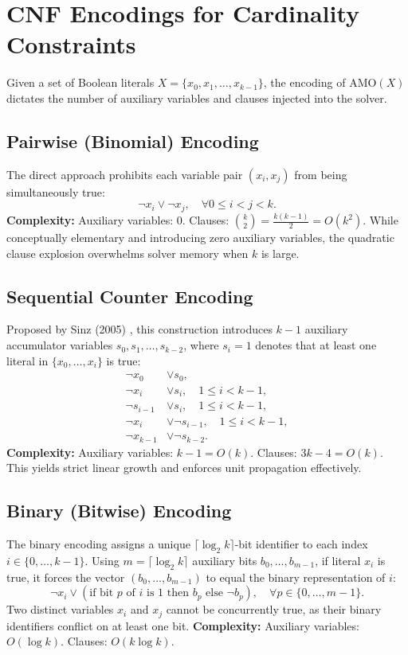 \documentclass[a4paper,fleqn]{cas-sc}
\begin{document}
\section{CNF Encodings for Cardinality Constraints}
Given a set of Boolean literals $X = \{x_0, x_1, \dots, x_{k-1}\}$, the encoding of $\text{AMO}(X)$ dictates the number of auxiliary variables and clauses injected into the solver.

\subsection{Pairwise (Binomial) Encoding}
The direct approach prohibits each variable pair $(x_i, x_j)$ from being simultaneously true:
\begin{equation}
\neg x_i \lor \neg x_j, \quad \forall 0 \le i < j < k.
\end{equation}
\textbf{Complexity:} Auxiliary variables: $0$. Clauses: $\binom{k}{2} = \frac{k(k-1)}{2} = O(k^2)$.
While conceptually elementary and introducing zero auxiliary variables, the quadratic clause explosion overwhelms solver memory when $k$ is large.

\subsection{Sequential Counter Encoding}
Proposed by Sinz (2005) \cite{sinz2005towards}, this construction introduces $k - 1$ auxiliary accumulator variables $s_0, s_1, \dots, s_{k-2}$, where $s_i = 1$ denotes that at least one literal in $\{x_0, \dots, x_i\}$ is true:
\begin{align}
\neg x_0 &\lor s_0, \\
\neg x_i &\lor s_i, \quad 1 \le i < k - 1, \\
\neg s_{i-1} &\lor s_i, \quad 1 \le i < k - 1, \\
\neg x_i &\lor \neg s_{i-1}, \quad 1 \le i < k - 1, \\
\neg x_{k-1} &\lor \neg s_{k-2}.
\end{align}
\textbf{Complexity:} Auxiliary variables: $k - 1 = O(k)$. Clauses: $3k - 4 = O(k)$.
This yields strict linear growth and enforces unit propagation effectively.

\subsection{Binary (Bitwise) Encoding}
The binary encoding assigns a unique $\lceil \log_2 k \rceil$-bit identifier to each index $i \in \{0, \dots, k-1\}$. Using $m = \lceil \log_2 k \rceil$ auxiliary bits $b_0, \dots, b_{m-1}$, if literal $x_i$ is true, it forces the vector $(b_0, \dots, b_{m-1})$ to equal the binary representation of $i$:
\begin{equation}
\neg x_i \lor (\text{if bit } p \text{ of } i \text{ is } 1 \text{ then } b_p \text{ else } \neg b_p), \quad \forall p \in \{0, \dots, m-1\}.
\end{equation}
Two distinct variables $x_i$ and $x_j$ cannot be concurrently true, as their binary identifiers conflict on at least one bit.
\textbf{Complexity:} Auxiliary variables: $O(\log k)$. Clauses: $O(k \log k)$.
\end{document}
